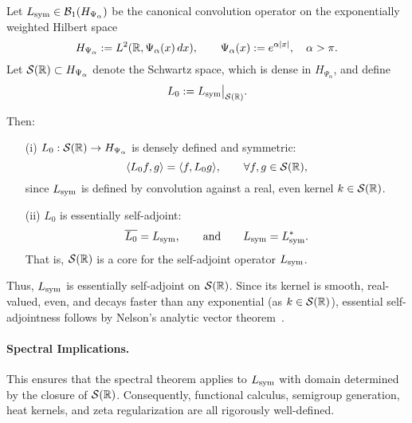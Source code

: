 \begin{lemma}
\label{lem:core_essential_sa}
Let \( L_{\mathrm{sym}} \in \mathcal{B}_1(H_{\Psi_\alpha}) \) be the canonical convolution operator on the exponentially weighted Hilbert space
\[
H_{\Psi_\alpha} := L^2(\mathbb{R}, \Psi_\alpha(x)\, dx), \qquad \Psi_\alpha(x) := e^{\alpha |x|}, \quad \alpha > \pi.
\]
Let \( \mathcal{S}(\mathbb{R}) \subset H_{\Psi_\alpha} \) denote the Schwartz space, which is dense in \( H_{\Psi_\alpha} \), and define
\[
L_0 := L_{\mathrm{sym}} \big|_{\mathcal{S}(\mathbb{R})}.
\]

Then:
\begin{enumerate}
  \item[\textnormal{(i)}] \( L_0 : \mathcal{S}(\mathbb{R}) \to H_{\Psi_\alpha} \) is densely defined and symmetric:
  \[
  \langle L_0 f, g \rangle = \langle f, L_0 g \rangle, \qquad \forall f, g \in \mathcal{S}(\mathbb{R}),
  \]
  since \( L_{\mathrm{sym}} \) is defined by convolution against a real, even kernel \( k \in \mathcal{S}(\mathbb{R}) \).

  \item[\textnormal{(ii)}] \( L_0 \) is essentially self-adjoint:
  \[
  \overline{L_0} = L_{\mathrm{sym}}, \qquad \text{and} \qquad L_{\mathrm{sym}} = L_{\mathrm{sym}}^*.
  \]
  That is, \( \mathcal{S}(\mathbb{R}) \) is a core for the self-adjoint operator \( L_{\mathrm{sym}} \).
\end{enumerate}

\medskip
\noindent
Thus, \( L_{\mathrm{sym}} \) is essentially self-adjoint on \( \mathcal{S}(\mathbb{R}) \). Since its kernel is smooth, real-valued, even, and decays faster than any exponential (as \( k \in \mathcal{S}(\mathbb{R}) \)), essential self-adjointness follows by Nelson’s analytic vector theorem~\cite[Thm.~X.36]{ReedSimon1975II}.

\paragraph{Spectral Implications.}
This ensures that the spectral theorem applies to \( L_{\mathrm{sym}} \) with domain determined by the closure of \( \mathcal{S}(\mathbb{R}) \). Consequently, functional calculus, semigroup generation, heat kernels, and zeta regularization are all rigorously well-defined.
\end{lemma}
